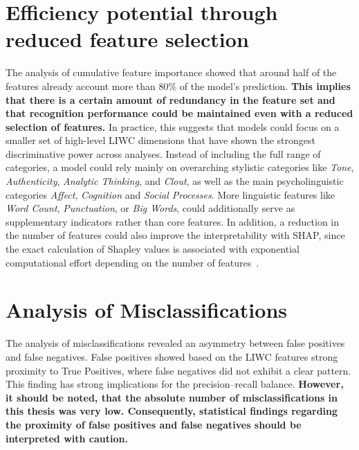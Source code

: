 
\section{Efficiency potential through reduced feature selection}


The analysis of cumulative feature importance showed that around half of the features already account more than 80\% of the model's prediction. \textbf{This implies that there is a certain amount of redundancy in the feature set and that recognition performance could be maintained even with a reduced selection of features.} In practice, this suggests that models could focus on a smaller set of high-level LIWC dimensions that have shown the strongest discriminative power across analyses. Instead of including the full range of categories, a model could rely mainly on overarching stylistic categories like \textit{Tone}, \textit{Authenticity}, \textit{Analytic Thinking}, and \textit{Clout}, as well as the main psycholinguistic categories \textit{Affect}, \textit{Cognition} and \textit{Social Processes}. More linguistic features like \textit{Word Count}, \textit{Punctuation}, or \textit{Big Words}, could additionally serve as supplementary indicators rather than core features. In addition, a reduction in the number of features could also improve the interpretability with SHAP, since the exact calculation of Shapley values is associated with exponential computational effort depending on the number of features~\cite{fryer2021shapley}.
\section{Analysis of Misclassifications}

The analysis of misclassifications revealed an asymmetry between false positives and false negatives. False positives showed based on the LIWC features strong proximity to True Positives, where false negatives did not exhibit a clear pattern. This finding has strong implications for the precision–recall balance. \textbf{However, it should be noted, that the absolute number of misclassifications in this thesis was very low. Consequently, statistical findings regarding the proximity of false positives and false negatives should be interpreted with caution.}

